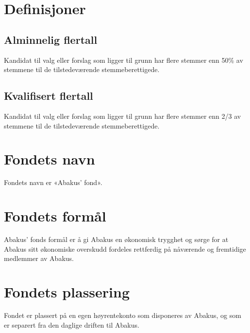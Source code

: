 \section{Definisjoner}

\subsection{Alminnelig flertall}
Kandidat til valg eller forslag som ligger til grunn har flere stemmer enn 50\%
av stemmene til de tilstedeværende stemmeberettigede.

\subsection{Kvalifisert flertall}
Kandidat til valg eller forslag som ligger til grunn har flere stemmer enn 2/3
av stemmene til de tilstedeværende stemmeberettigede.

\section{Fondets navn}
Fondets navn er «Abakus’ fond».

\section{Fondets formål}
Abakus’ fonds formål er å gi Abakus en økonomisk trygghet og sørge for at Abakus sitt 
økonomiske overskudd fordeles rettferdig på nåværende og fremtidige medlemmer av 
Abakus.
\section{Fondets plassering}
Fondet er plassert på en egen høyrentekonto som disponeres av Abakus, og som er separert 
fra den daglige driften til Abakus.

